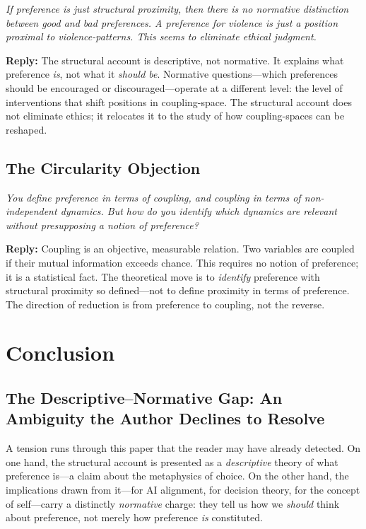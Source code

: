 \documentclass[12pt,a4paper]{article}
\begin{document}
\textit{If preference is just structural proximity, then there is no normative distinction between good and bad preferences. A preference for violence is just a position proximal to violence-patterns. This seems to eliminate ethical judgment.}

\textbf{Reply:} The structural account is descriptive, not normative. It explains what preference \emph{is}, not what it \emph{should be}. Normative questions---which preferences should be encouraged or discouraged---operate at a different level: the level of interventions that shift positions in coupling-space. The structural account does not eliminate ethics; it relocates it to the study of how coupling-spaces can be reshaped.

\subsection{The Circularity Objection}

\textit{You define preference in terms of coupling, and coupling in terms of non-independent dynamics. But how do you identify which dynamics are relevant without presupposing a notion of preference?}

\textbf{Reply:} Coupling is an objective, measurable relation. Two variables are coupled if their mutual information exceeds chance. This requires no notion of preference; it is a statistical fact. The theoretical move is to \emph{identify} preference with structural proximity so defined---not to define proximity in terms of preference. The direction of reduction is from preference to coupling, not the reverse.

\section{Conclusion}

\subsection{The Descriptive--Normative Gap: An Ambiguity the Author Declines to Resolve}
\label{sec:ambiguity}

A tension runs through this paper that the reader may have already detected. On one hand, the structural account is presented as a \emph{descriptive} theory of what preference is---a claim about the metaphysics of choice. On the other hand, the implications drawn from it---for AI alignment, for decision theory, for the concept of self---carry a distinctly \emph{normative} charge: they tell us how we \emph{should} think about preference, not merely how preference \emph{is} constituted.
\end{document}
